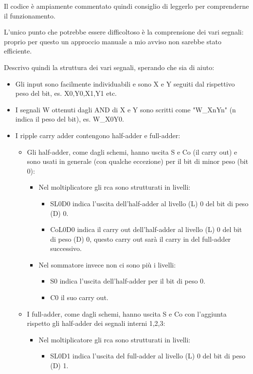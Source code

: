 \documentclass[12pt, letterpaper]{article}
\begin{document}
Il codice è ampiamente commentato quindi consiglio di leggerlo per comprenderne il funzionamento.

L'unico punto che potrebbe essere difficoltoso è la comprensione dei vari segnali: proprio per questo un approccio manuale a mio avviso non sarebbe stato efficiente.

Descrivo quindi la struttura dei vari segnali, sperando che sia di aiuto:

\begin{itemize}
\item Gli input sono facilmente individuabili e sono X e Y seguiti dal rispettivo peso del bit, es. X0,Y0,X1,Y1 etc.
\item I segnali W ottenuti dagli AND di X e Y sono scritti come "W\_XnYn" (n indica il peso del bit), es. W\_X0Y0.
\item I ripple carry adder contengono half-adder e full-adder:
\begin{itemize}
\item Gli half-adder, come dagli schemi, hanno uscita S e Co (il carry out) e sono usati in generale (con qualche eccezione) per il bit di minor peso (bit 0):
\begin{itemize}
\item Nel moltiplicatore gli rca sono strutturati in livelli:
\begin{itemize}
\item SL0D0 indica l'uscita dell'half-adder al livello (L) 0 del bit di peso (D) 0.
\item CoL0D0 indica il carry out dell'half-adder al livello (L) 0 del bit di peso (D) 0, questo carry out sarà il carry in del full-adder successivo.
\end{itemize}
\item Nel sommatore invece non ci sono più i livelli:
\begin{itemize}
\item S0 indica l'uscita dell'half-adder per il bit di peso 0.
\item C0 il suo carry out.
\end{itemize}
\end{itemize}
\item I full-adder, come dagli schemi, hanno uscita S e Co con l'aggiunta rispetto gli half-adder dei segnali interni 1,2,3:
\begin{itemize}
\item Nel moltiplicatore gli rca sono strutturati in livelli:
\begin{itemize}
\item SL0D1 indica l'uscita del full-adder al livello (L) 0 del bit di peso (D) 1.

\end{itemize}
\end{itemize}
\end{itemize}
\end{itemize}
\end{document}

